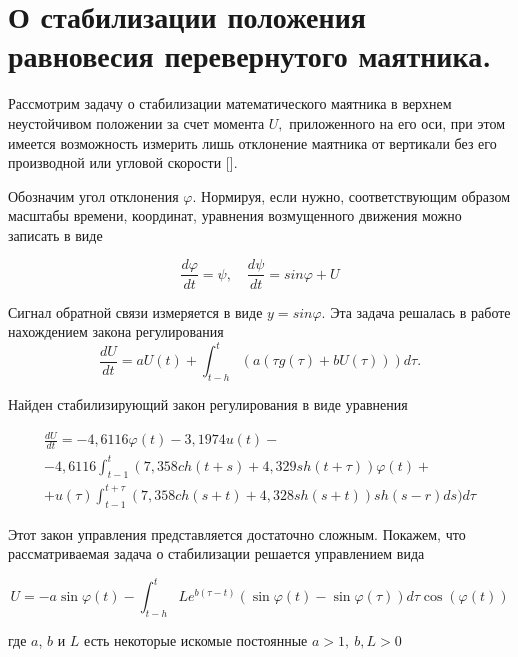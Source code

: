 \section{О стабилизации положения равновесия перевернутого маятника.} \label{p14}

Рассмотрим задачу о стабилизации математического маятника в верхнем неустойчивом положении за счет момента $U,$ приложенного на его оси, при этом имеется возможность измерить лишь отклонение маятника от вертикали без его производной или угловой скорости [].

Обозначим угол отклонения $\varphi.$ Нормируя, если нужно, соответствующим образом масштабы времени, координат, уравнения возмущенного движения можно записать в виде

\begin{equation} \label{1.45'}
\frac{d \varphi}{dt} = \psi, \quad \frac{d \psi}{dt} = sin \varphi + U
\end{equation}

Сигнал обратной связи измеряется в виде $y = sin \varphi$. Эта задача решалась в работе \cite{krasovsk63} нахождением закона регулирования $$\frac{d U}{d t} = a U(t) + \int_{t - h}^{t} (a (\tau g (\tau) + b U (\tau))) d \tau.$$

Найден стабилизирующий закон регулирования в виде уравнения

\begin{equation} \label{1.46'}
\begin{array}{c}
\displaystyle \frac{d U}{d t} = - 4,6116 \varphi (t) - 3,1974 u(t) -\\
\displaystyle - 4,6116 \int_{t - 1}^{t} (7,358 ch(t + s) + 4,329 sh(t + \tau)) \varphi (t) +\\
\displaystyle + u(\tau) \int_{t - 1}^{t + \tau} (7,358 ch(s + t) + 4,328 sh(s + t)) sh(s - r) ds) d \tau
\end{array}
\end{equation}

Этот закон управления представляется достаточно сложным. Покажем, что рассматриваемая задача о стабилизации решается управлением вида 

\begin{equation} \label{1.47'}
U = - a \sin \varphi (t) - \int_{t-h}^{t} L e^{ b (\tau - t)} (\sin \varphi (t) - \sin \varphi (\tau)) d \tau \cos (\varphi(t))
\end{equation}

где $a$, $b$ и $L$ есть некоторые искомые постоянные $a > 1, \ b, L > 0$

